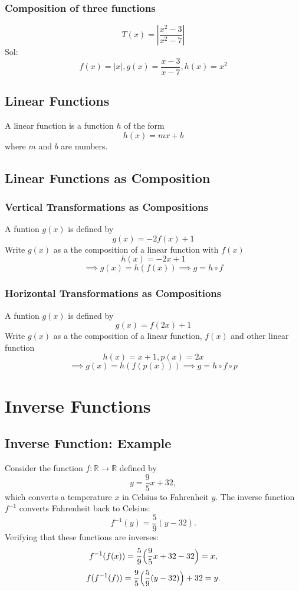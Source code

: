 \subsubsection{Composition of three functions}
\[T(x) = \left| \frac{x^{2}-3}{x^{2} - 7}  \right| \]
Sol:
\[f(x) = |x|, g(x) = \frac{x-3}{x-7}, h(x) = x^{2}\]

\subsection{Linear Functions}
A linear function is a function \(h\) of the form
\[h(x) = mx + b\]
where \(m\) and \(b\) are numbers.

\subsection{Linear Functions as Composition}
\subsubsection{Vertical Transformations as Compositions}
A funtion \(g(x)\) is defined by
\[g(x)= -2f(x)+1\]
Write \(g(x)\) as a the composition of a linear function with \(f(x)\)
\[h(x) = -2x + 1 \]
\[\implies g(x) = h(f(x)) \implies g = h \circ f \]

\subsubsection{Horizontal Transformations as Compositions}
A funtion \(g(x)\) is defined by
\[g(x)= f(2x)+1\]
Write \(g(x)\) as a the composition of a linear function,  \(f(x)\) and other linear function
\[h(x) = x + 1, p(x) = 2x \]
\[\implies g(x) = h(f(p(x))) \implies g = h \circ f \circ p \]

\section{Inverse Functions}
\subsection{Inverse Function: Example}
Consider the function \( f: \mathbb{R} \to \mathbb{R} \) defined by
\[ y = \frac{9}{5}x + 32, \]
which converts a temperature \( x \) in Celsius to Fahrenheit \( y \). 
The inverse function \( f^{-1} \) converts Fahrenheit back to Celsius:
\[ f^{-1}(y) = \frac{5}{9}(y - 32). \]
Verifying that these functions are inverses:
\[ f^{-1}(f(x)) = \frac{5}{9}\Bigl(\frac{9}{5}x + 32 - 32\Bigr) = x, \]
\[ f(f^{-1}(f)) = \frac{9}{5}\Bigl(\frac{5}{9}(y - 32)\Bigr) + 32 = y. \]

